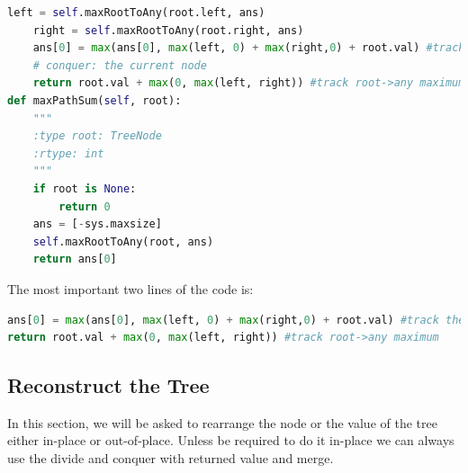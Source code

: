 \documentclass[../main.tex]{subfiles}
\begin{document}
\begin{examples}[resume]
\begin{lstlisting}[language=Python]
    left = self.maxRootToAny(root.left, ans)
    right = self.maxRootToAny(root.right, ans)
    ans[0] = max(ans[0], max(left, 0) + max(right,0) + root.val) #track the any->root->any maximum
    # conquer: the current node
    return root.val + max(0, max(left, right)) #track root->any maximum
def maxPathSum(self, root):
    """
    :type root: TreeNode
    :rtype: int
    """
    if root is None:
        return 0
    ans = [-sys.maxsize]
    self.maxRootToAny(root, ans)
    return ans[0]
\end{lstlisting}
The most important two lines of the code is:
\begin{lstlisting}[language=Python]
ans[0] = max(ans[0], max(left, 0) + max(right,0) + root.val) #track the any->root->any maximum
return root.val + max(0, max(left, right)) #track root->any maximum
\end{lstlisting}
\end{examples}
\subsection{Reconstruct the Tree}
In this section, we will be asked to rearrange the node or the value of the tree either in-place or out-of-place. Unless be required to do it in-place we can always use the divide and conquer with returned value and merge. 
\end{document}
